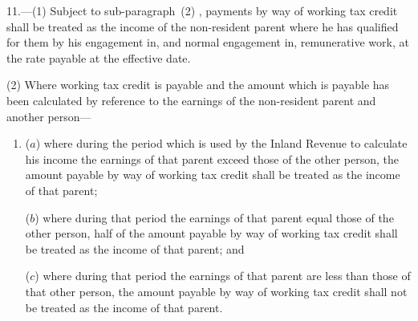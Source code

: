 \documentclass[12pt,a4paper]{article}
\begin{document}
11.---(1)  Subject to 
sub-paragraph~(2)%
, payments by way of 
working tax credit  %
shall be treated as the income of the non-resident parent where he has qualified for them by his engagement in, and normal engagement in, remunerative work, at the rate payable at the effective date.

(2) Where 
working tax credit  %
is payable and the amount which is payable has been calculated by reference to 
the earnings  %
of the non-resident parent and another person—
\begin{enumerate}\item[]
($a$) where during the period which is used by the Inland Revenue to calculate his income 
the earnings  %
of that parent exceed those of the other person, the amount payable by way of 
working tax credit  %
shall be treated as the income of that parent;

($b$) where during that period 
the earnings  %
of that parent equal those of the other person, half of the amount payable by way of 
working tax credit  %
shall be treated as the income of that parent; and

($c$) where during that period 
the earnings  %
of that parent are less than those of that other person, the amount payable by way of 
working tax credit  %
shall not be treated as the income of that parent.
\end{enumerate}
\end{document}
